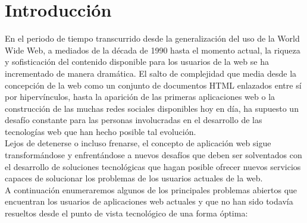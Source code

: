\chapter{Introducci\'on}

En el periodo de tiempo transcurrido desde la generalizaci\'on del uso de la World Wide Web, a mediados de la d\'ecada de 1990 hasta el momento actual, 
la riqueza y sofisticaci\'on del contenido disponible para los usuarios de la web se ha incrementado de manera dram\'atica.
El salto de complejidad que media desde la concepci\'on de la web como un conjunto de documentos HTML enlazados entre s\'i por hiperv\'inculos, 
hasta la aparici\'on de las primeras aplicaciones web o la construcci\'on de las muchas redes sociales disponibles hoy en d\'ia, ha supuesto un desaf\'io constante 
para las personas involucradas en el desarrollo de las tecnolog\'ias web que han hecho posible tal evoluci\'on.\\
Lejos de detenerse o incluso frenarse, el concepto de aplicaci\'on web sigue transform\'andose y enfrent\'andose a nuevos desaf\'ios que deben ser solventados
 con el desarrollo de soluciones tecnol\'ogicas que hagan posible ofrecer nuevos servicios capaces de solucionar los problemas de los usuarios actuales de la web.\\
A continuaci\'on enumeraremos algunos de los principales problemas abiertos que encuentran los usuarios de aplicaciones web actuales y que no han sido todav\'ia 
resueltos desde el punto de vista tecnol\'ogico de una forma \'optima:

